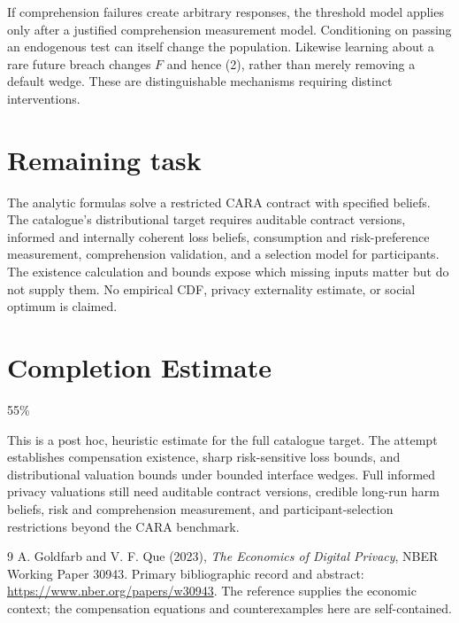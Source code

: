 \documentclass[11pt,a4paper]{article}
\begin{document}
If comprehension failures create arbitrary responses, the threshold model applies only after a justified comprehension measurement model. Conditioning on passing an endogenous test can itself change the population. Likewise learning about a rare future breach changes $F$ and hence (2), rather than merely removing a default wedge. These are distinguishable mechanisms requiring distinct interventions.

\section{Remaining task}
The analytic formulas solve a restricted CARA contract with specified beliefs. The catalogue's distributional target requires auditable contract versions, informed and internally coherent loss beliefs, consumption and risk-preference measurement, comprehension validation, and a selection model for participants. The existence calculation and bounds expose which missing inputs matter but do not supply them. No empirical CDF, privacy externality estimate, or social optimum is claimed.

\section{Completion Estimate}
55\%

This is a post hoc, heuristic estimate for the full catalogue target.
The attempt establishes compensation existence, sharp risk-sensitive loss bounds, and distributional valuation bounds under bounded interface wedges. Full informed privacy valuations still need auditable contract versions, credible long-run harm beliefs, risk and comprehension measurement, and participant-selection restrictions beyond the CARA benchmark.

\begin{thebibliography}{9}
 A. Goldfarb and V. F. Que (2023), \emph{The Economics of Digital Privacy}, NBER Working Paper 30943. Primary bibliographic record and abstract: \url{https://www.nber.org/papers/w30943}. The reference supplies the economic context; the compensation equations and counterexamples here are self-contained.
\end{thebibliography}
\end{document}
